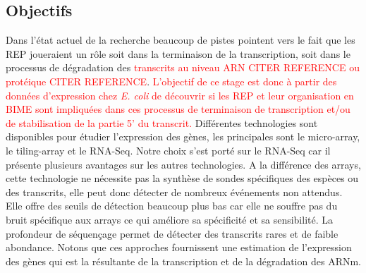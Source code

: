 \documentclass[12pt,a4paper]{report}
\begin{document}
\begin{onehalfspace}
\section*{Objectifs}
Dans l'état actuel de la recherche beaucoup de pistes pointent vers le fait que les REP joueraient un rôle soit dans la terminaison de la transcription, soit dans le processus de dégradation des \textcolor{red}{transcrits au niveau ARN CITER REFERENCE ou protéique CITER REFERENCE}. \textcolor{red}{L'objectif de ce stage est donc à partir des données d'expression chez \textit{E. coli} de découvrir si les REP et leur organisation en BIME sont impliquées dans ces processus de terminaison de transcription et/ou de stabilisation de la partie 5' du transcrit.} Différentes technologies sont disponibles pour étudier l'expression des gènes, les principales sont le micro-array, le \gls{tiling-array} et le \gls{RNA-Seq}. Notre choix s'est porté sur le RNA-Seq car il présente plusieurs avantages sur les autres technologies. A la différence des arrays, cette technologie ne nécessite pas la synthèse de sondes spécifiques des espèces ou des transcrits, elle peut donc détecter de nombreux événements non attendus. Elle offre des seuils de détection beaucoup plus bas car elle ne souffre pas du bruit spécifique aux arrays ce qui améliore sa spécificité et sa sensibilité. La profondeur de séquençage permet de détecter des transcrits rares et de faible abondance. Notons que ces approches fournissent une estimation de l'expression des gènes qui est la résultante de la transcription et de la dégradation des ARNm.


\end{onehalfspace}
\end{document}
